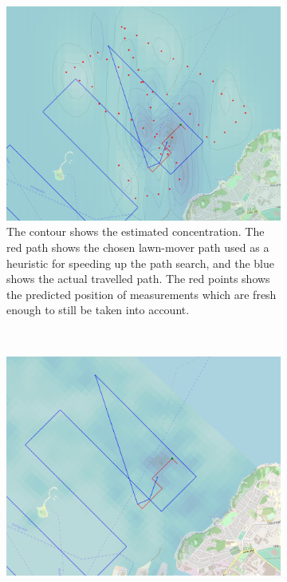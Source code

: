 \documentclass[conference]{IEEEtran}
\begin{document}
\begin{figure}[tbp]
     \centering
     \begin{subfigure}[b]{\linewidth}
         \centering
         \includegraphics[width=\textwidth]{figures/sim-estimate.png}
         \caption{The contour shows the estimated concentration. The
           red path shows the chosen lawn-mover path used as a
           heuristic for speeding up the path search, and the blue
           shows the actual travelled path. The red points shows the
           predicted position of measurements which are fresh enough
           to still be taken into account.}
         \label{fig:sim-estimation}
     \end{subfigure}
     \\
     \begin{subfigure}[b]{\linewidth}
         \centering
         \includegraphics[width=\textwidth]{figures/sim-gt.png}

\end{subfigure}
\end{figure}
\end{document}
